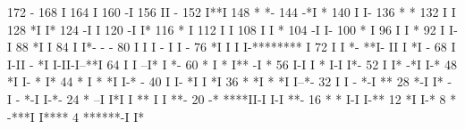 \begin{Listing}
      172                                    -
      168                                    I
      164                                    I
      160                                   -I
      156                                   II -
      152                                   I**I
      148                                   *  *-
      144                                 -*I   *
      140                                 I     I-
      136                                 *      *
      132                                 I      I
      128                                *I      I*
      124                                -I       I
      120                               -I        I*
      116                               *         I
      112                               I         I
      108                               I         I *
      104                              -I         I-
      100                              *           I
       96                              I           I *
       92                              I           I-I
       88                             *I             I
       84                             I              I*-                              - -
       80                             I              I I                        -     I I  -
       76                            *I              I I                        I-******** I
       72                             I              I *-                       **I- II I *I -
       68                             I              I-II                    - *I  I-II-I--**I
       64                             I                 I                  --I* I            *-
       60                           * I                 *                  I** -I             *
       56                           I-I                 I                  * I-I              I*-
       52                           I                   I*               -*I                  I-*
       48                          *I                    I-              *                      I*
       44       *                  I                      *             *I                      I-* -
       40                          I                      I-           *I                        I *I
       36        *                *I                       *          *I                         I--*-
       32                          I                       I    -    *-I                             **
       28                        *-I                       I* - I - *-I                              I-*-
       24         *             --I                         I*I I ** I                                I **-
       20                      -*                             ****II-I                                I-I **-
       16          *           *                              I-I                                         I-**
       12                     *I                                                                            I-*
        8           *     -***I                                                                               I****
        4            ******-I                                                                                     I*
 

\end{Listing}
